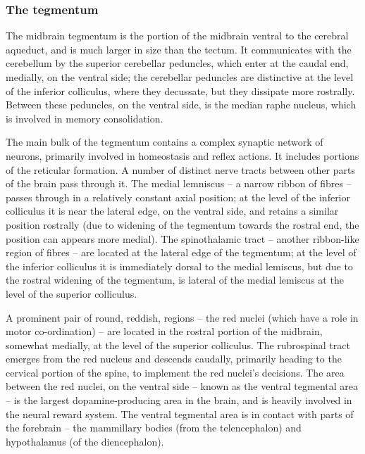 \documentclass[]{book}
\begin{document}
\hypertarget{the-tegmentum}{%
\subsubsection{The tegmentum}\label{the-tegmentum}}

The midbrain tegmentum is the portion of the midbrain ventral to the cerebral aqueduct, and is much larger in size than the tectum. It communicates with the cerebellum by the superior cerebellar peduncles, which enter at the caudal end, medially, on the ventral side; the cerebellar peduncles are distinctive at the level of the inferior colliculus, where they decussate, but they dissipate more rostrally. Between these peduncles, on the ventral side, is the median raphe nucleus, which is involved in memory consolidation.

The main bulk of the tegmentum contains a complex synaptic network of neurons, primarily involved in homeostasis and reflex actions. It includes portions of the reticular formation. A number of distinct nerve tracts between other parts of the brain pass through it. The medial lemniscus -- a narrow ribbon of fibres -- passes through in a relatively constant axial position; at the level of the inferior colliculus it is near the lateral edge, on the ventral side, and retains a similar position rostrally (due to widening of the tegmentum towards the rostral end, the position can appears more medial). The spinothalamic tract -- another ribbon-like region of fibres -- are located at the lateral edge of the tegmentum; at the level of the inferior colliculus it is immediately dorsal to the medial lemiscus, but due to the rostral widening of the tegmentum, is lateral of the medial lemiscus at the level of the superior colliculus.

A prominent pair of round, reddish, regions -- the red nuclei (which have a role in motor co-ordination) -- are located in the rostral portion of the midbrain, somewhat medially, at the level of the superior colliculus. The rubrospinal tract emerges from the red nucleus and descends caudally, primarily heading to the cervical portion of the spine, to implement the red nuclei's decisions. The area between the red nuclei, on the ventral side -- known as the ventral tegmental area -- is the largest dopamine-producing area in the brain, and is heavily involved in the neural reward system. The ventral tegmental area is in contact with parts of the forebrain -- the mammillary bodies (from the telencephalon) and hypothalamus (of the diencephalon).
\end{document}
